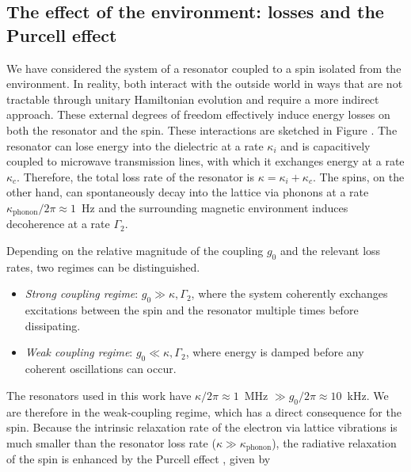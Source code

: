 \subsection{The effect of the environment: losses and the Purcell effect}

We have considered the system of a resonator coupled to a spin isolated from the environment. In reality, both interact with the outside world in ways that are not tractable through unitary Hamiltonian evolution and require a more indirect approach. These external degrees of freedom effectively induce energy losses on both the resonator and the spin. These interactions are sketched in Figure . The resonator can lose energy into the dielectric at a rate $\kappa_i$ and is capacitively coupled to microwave transmission lines, with which it exchanges energy at a rate $\kappa_c$. Therefore, the total loss rate of the resonator is $\kappa = \kappa_i + \kappa_c$.  The spins, on the other hand, can spontaneously decay into the lattice via phonons at a rate $\kappa_\text{phonon}/2\pi \approx 1$~Hz  and the surrounding magnetic environment induces decoherence at a rate $\Gamma_2$.

Depending on the relative magnitude of the coupling $g_0$ and the relevant loss rates, two regimes can be distinguished.

\begin{itemize}
    \item \textit{Strong coupling regime}: $g_0 \gg \kappa, \Gamma_2$, where the system coherently exchanges excitations between the spin and the resonator multiple times before dissipating.
    \item \textit{Weak coupling regime}: $g_0 \ll \kappa, \Gamma_2$, where energy is damped before any coherent oscillations can occur.
\end{itemize}

The resonators used in this work have $\kappa/2\pi \approx 1$~MHz $\gg g_0/2\pi \approx 10$~kHz. We are therefore in the weak-coupling regime, which has a direct consequence for the \Er spin. Because the intrinsic relaxation rate of the electron via lattice vibrations is much smaller than the resonator loss rate ($\kappa \gg \kappa_\text{phonon}$), the radiative relaxation of the spin is enhanced by the Purcell effect , given by

